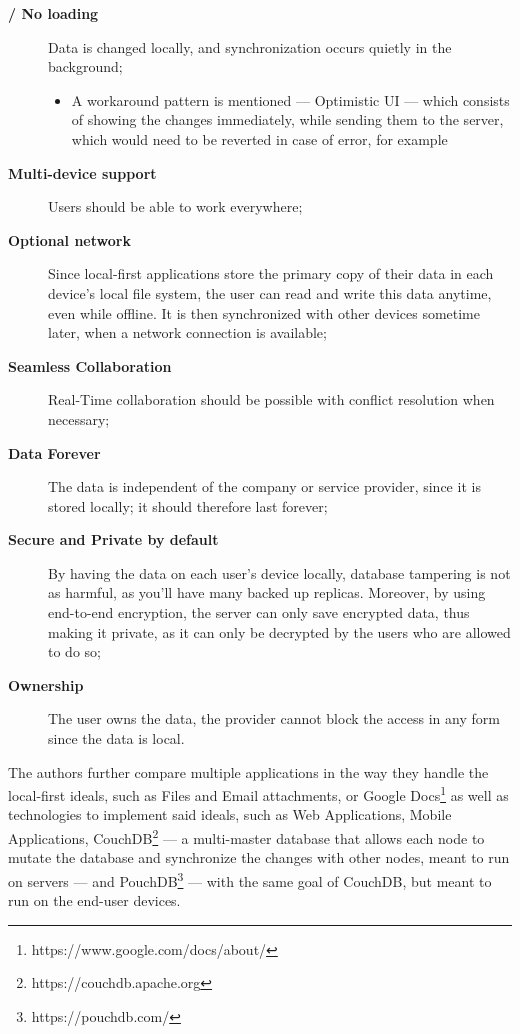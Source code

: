 \begin{description}
    \item[\textbf{ / No loading}] Data is changed locally, and synchronization occurs quietly in the background;
    \begin{itemize}
        \item A workaround pattern is mentioned --- Optimistic UI --- which consists of showing the changes immediately, while sending them to the server, which would need to be reverted in case of error, for example
    \end{itemize}
    \item[\textbf{Multi-device support}] Users should be able to work everywhere;
    \item[\textbf{Optional network}] Since local-first applications store the primary copy of their data in each device’s local file system, the user can read and write this data anytime, even while offline. It is then synchronized with other devices sometime later, when a network connection is available;
    \item[\textbf{Seamless Collaboration}] Real-Time collaboration should be possible with conflict resolution when necessary;
    \item[\textbf{Data Forever}] The data is independent of the company or service provider, since it is stored locally; it should therefore last forever;
    \item[\textbf{Secure and Private by default}] By having the data on each user's device locally, database tampering is not as harmful, as you'll have many backed up replicas. Moreover, by using end-to-end encryption, the server can only save encrypted data, thus making it private, as it can only be decrypted by the users who are allowed to do so;
    \item[\textbf{Ownership}] The user owns the data, the provider cannot block the access in any form since the data is local.
\end{description}

The authors further compare multiple applications in the way they handle the local-first ideals, such as Files and Email attachments, or Google Docs\footnote{https://www.google.com/docs/about/} as well as technologies to implement said ideals, such as Web Applications, Mobile Applications, CouchDB\footnote{https://couchdb.apache.org} --- a multi-master database that allows each node to mutate the database and synchronize the changes with other nodes, meant to run on servers --- and PouchDB\footnote{https://pouchdb.com/} --- with the same goal of CouchDB, but meant to run on the end-user devices.

